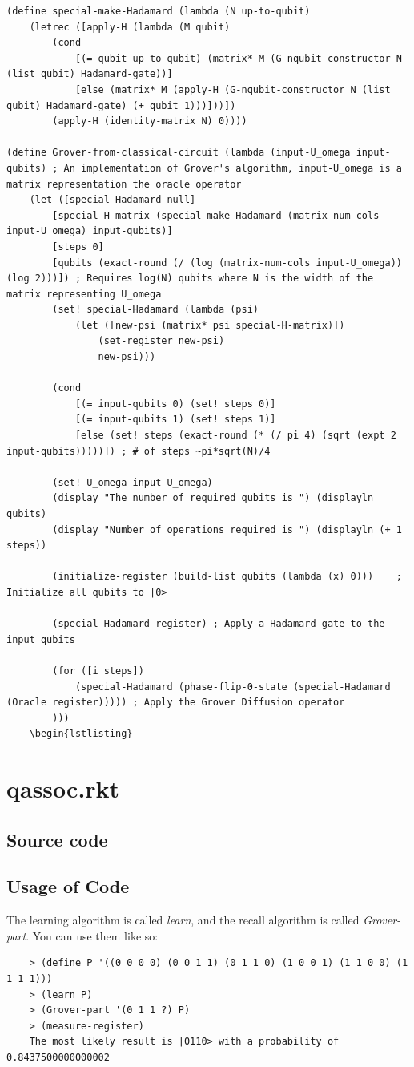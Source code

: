 \documentclass[11pt]{report}
\newcommand{\?}{\stackrel{?}{=}}
\begin{document}
\begin{appendix}
\begin{lstlisting}
(define special-make-Hadamard (lambda (N up-to-qubit)
	(letrec ([apply-H (lambda (M qubit)
		(cond
			[(= qubit up-to-qubit) (matrix* M (G-nqubit-constructor N (list qubit) Hadamard-gate))]
			[else (matrix* M (apply-H (G-nqubit-constructor N (list qubit) Hadamard-gate) (+ qubit 1)))]))])
		(apply-H (identity-matrix N) 0))))

(define Grover-from-classical-circuit (lambda (input-U_omega input-qubits) ; An implementation of Grover's algorithm, input-U_omega is a matrix representation the oracle operator
	(let ([special-Hadamard null]
		[special-H-matrix (special-make-Hadamard (matrix-num-cols input-U_omega) input-qubits)] 
		[steps 0] 
		[qubits (exact-round (/ (log (matrix-num-cols input-U_omega)) (log 2)))]) ; Requires log(N) qubits where N is the width of the matrix representing U_omega
		(set! special-Hadamard (lambda (psi)
			(let ([new-psi (matrix* psi special-H-matrix)])
				(set-register new-psi)
				new-psi)))

		(cond
			[(= input-qubits 0) (set! steps 0)]
			[(= input-qubits 1) (set! steps 1)]
			[else (set! steps (exact-round (* (/ pi 4) (sqrt (expt 2 input-qubits)))))]) ; # of steps ~pi*sqrt(N)/4

		(set! U_omega input-U_omega)
		(display "The number of required qubits is ") (displayln qubits)
		(display "Number of operations required is ") (displayln (+ 1 steps))

		(initialize-register (build-list qubits (lambda (x) 0)))	; Initialize all qubits to |0>

		(special-Hadamard register)	; Apply a Hadamard gate to the input qubits

		(for ([i steps])
			(special-Hadamard (phase-flip-0-state (special-Hadamard (Oracle register))))) ; Apply the Grover Diffusion operator
		)))
	\begin{lstlisting}
	\end{lstlisting}
	
	\chapter{qassoc.rkt}
	
	\section{Source code}

	
	
	\section{Usage of Code}
	
	The learning algorithm is called \textit{learn}, and the recall algorithm is called \textit{Grover-part}. You can use them like so:
	
	\begin{lstlisting}
	> (define P '((0 0 0 0) (0 0 1 1) (0 1 1 0) (1 0 0 1) (1 1 0 0) (1 1 1 1)))
	> (learn P)
	> (Grover-part '(0 1 1 ?) P)
	> (measure-register)
	The most likely result is |0110> with a probability of 0.8437500000000002
	\end{lstlisting}
\end{appendix}
\end{document}
